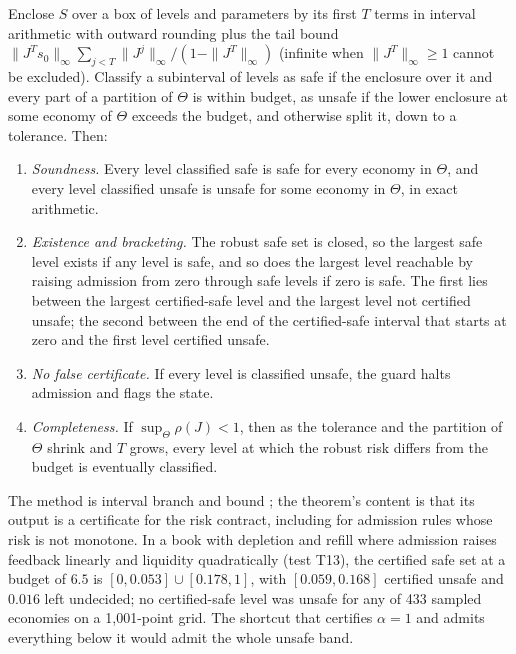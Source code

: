 \begin{theorem}\label{p2:thm:venuebb}
Enclose $S$ over a box of levels and parameters by its first $T$ terms in interval arithmetic with outward rounding plus the tail bound $\|J^Ts_0\|_\infty\sum_{j<T}\|J^j\|_\infty/(1-\|J^T\|_\infty)$ (infinite when $\|J^T\|_\infty\ge1$ cannot be excluded). Classify a subinterval of levels as safe if the enclosure over it and every part of a partition of $\Theta$ is within budget, as unsafe if the lower enclosure at some economy of $\Theta$ exceeds the budget, and otherwise split it, down to a tolerance. Then:
\begin{enumerate}[label=(\roman*)]
\item \emph{Soundness.} Every level classified safe is safe for every economy in $\Theta$, and every level classified unsafe is unsafe for some economy in $\Theta$, in exact arithmetic.
\item \emph{Existence and bracketing.} The robust safe set is closed, so the largest safe level exists if any level is safe, and so does the largest level reachable by raising admission from zero through safe levels if zero is safe. The first lies between the largest certified-safe level and the largest level not certified unsafe; the second between the end of the certified-safe interval that starts at zero and the first level certified unsafe.
\item \emph{No false certificate.} If every level is classified unsafe, the guard halts admission and flags the state.
\item \emph{Completeness.} If $\sup_\Theta\rho(J)<1$, then as the tolerance and the partition of $\Theta$ shrink and $T$ grows, every level at which the robust risk differs from the budget is eventually classified.
\end{enumerate}
\end{theorem}

The method is interval branch and bound \citep{p2:hansen2004}; the theorem's content is that its output is a certificate for the risk contract, including for admission rules whose risk is not monotone. In a book with depletion and refill where admission raises feedback linearly and liquidity quadratically (test T13), the certified safe set at a budget of $6.5$ is $[0,0.053]\cup[0.178,1]$, with $[0.059,0.168]$ certified unsafe and $0.016$ left undecided; no certified-safe level was unsafe for any of 433 sampled economies on a 1{,}001-point grid. The shortcut that certifies $\alpha=1$ and admits everything below it would admit the whole unsafe band.

